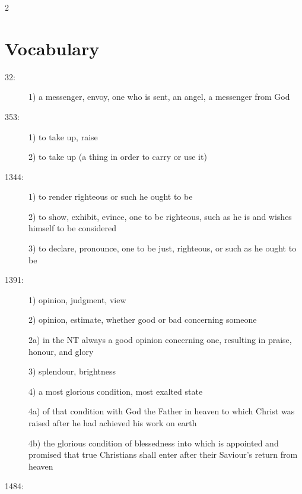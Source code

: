 \documentclass[letterpaper]{article}
\begin{document}
\begin{multicols}{2}
\small
\section*{Vocabulary}
\begin{description}

\item[32: ]



1) a messenger, envoy, one who is sent, an angel, a messenger
from God



\item[353: ]



1) to take up, raise

2) to take up (a thing in order to carry or use it)



\item[1344: ]



1) to render righteous or such he ought to be

2) to show, exhibit, evince, one to be righteous, such as he is
and wishes himself to be considered

3) to declare, pronounce, one to be just, righteous, or such as
he ought to be



\item[1391: ]



1) opinion, judgment, view

2) opinion, estimate, whether good or bad concerning someone

2a) in the NT always a good opinion concerning one, resulting in praise, honour, and glory

3) splendour, brightness

4) a most glorious condition, most exalted state

4a) of that condition with God the Father in heaven to which
Christ was raised after he had achieved his work on earth

4b) the glorious condition of blessedness into which is
appointed and promised that true Christians shall enter
after their Saviour's return from heaven



\item[1484: ]




\end{description}
\end{multicols}
\end{document}
